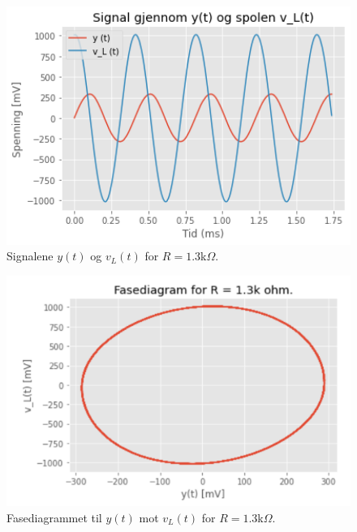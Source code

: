 \documentclass[a4paper,11pt,norsk]{article}
\begin{document}
\begin{figure}[htbp]
    \centering
    \includegraphics[width=1.0\textwidth]{img/os_R_1_3.png}
    \caption{Signalene $y(t)$ og $v_L(t)$ for $R = 1.3$k$\Omega$.}
    \label{fig: oscilloskop lavest SNR}
\end{figure}\newpage

\begin{figure}[htbp]
    \centering
    \includegraphics[width=1.0\textwidth]{img/fdg_R_1_3.png}
    \caption{Fasediagrammet til $y(t)$ mot $v_L(t)$ for $R = 1.3$k$\Omega$.}
    \label{fig: fasediagram lavest SNR}
\end{figure}\newpage
\end{document}
